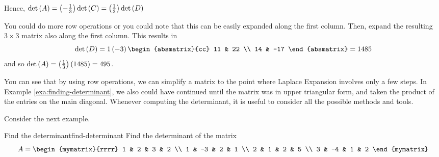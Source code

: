 \begin{solution}
Hence, $\det \left(A\right) = \left(-\frac{1}{3}\right) \det \left(C\right) = \left(\frac{1}{3}\right) \det \left(D\right)$ 

You could do more row operations or you could note that this can be easily
expanded along the first column. Then, expand the resulting $3 \times 3$ matrix
also along the first column. This results in 
\begin{equation*}
\det \tup{D} =1\tup{-3} \begin{absmatrix}{cc}
11 & 22 \\
14 & -17
\end{absmatrix}= 1485
\end{equation*}
and so  $\det \left(A\right) =\left(\frac{1}{3}\right) \left(1485\right)
=495$.
\end{solution} 

You can see that by using row operations, we can simplify a matrix
to the point where Laplace Expansion involves only a few steps. In Example
\ref{exa:finding-determinant}, we also could have continued until the matrix was in 
upper triangular form, and taken the product of the entries on the main diagonal. Whenever 
computing the determinant, it is useful to consider all the possible methods and tools.

Consider the next example.

\begin{example}{Find the determinant}{find-determinant}
Find the determinant of the matrix
\begin{equation*}
A = \begin{mymatrix}{rrrr}
1 & 2 & 3 & 2 \\
1 & -3 & 2 & 1 \\
2 & 1 & 2 & 5 \\
3 & -4 & 1 & 2
\end{mymatrix}
\end{equation*}
\end{example}

